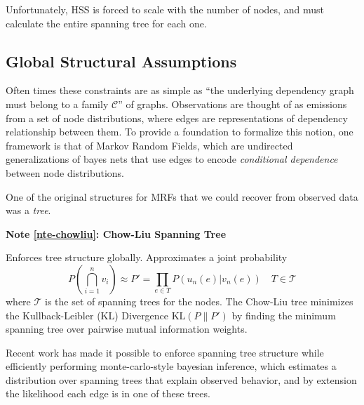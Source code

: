 \documentclass[%
	12pt,
		oneside,
		letterpaper
]{book}
\newcounter{quartocalloutnteno}
\newcommand{\quartocalloutnte}[1]{\refstepcounter{quartocalloutnteno}\label{#1}}
\begin{document}
Unfortunately, HSS is forced to scale with the number of nodes, and must
calculate the entire spanning tree for each one.

\subsection{Global Structural
Assumptions}\label{global-structural-assumptions}

Often times these constraints are as simple as ``the underlying
dependency graph must belong to a family \(\mathcal{C}\)'' of graphs.
Observations are thought of as emissions from a set of node
distributions, where edges are representations of dependency
relationship between them. To provide a foundation to formalize this
notion, one framework is that of Markov Random Fields, which are
undirected generalizations of bayes nets
\autocite{Markovrandomfields_Kindermann1980} that use edges to encode
\emph{conditional dependence} between node distributions.

One of the original structures for MRFs that we could recover from
observed data was a \emph{tree}.

\begin{tcolorbox}[enhanced jigsaw, opacityback=0, colframe=quarto-callout-note-color-frame, arc=.35mm, leftrule=.75mm, breakable, bottomrule=.15mm, left=2mm, colback=white, toprule=.15mm, rightrule=.15mm]

\quartocalloutnte{nte-chowliu} 

\vspace{-3mm}\textbf{Note \ref*{nte-chowliu}: Chow-Liu Spanning Tree}\vspace{3mm}

Enforces tree structure globally. Approximates a joint probability \[
P\left(\bigcap_{i=1}^n v_i\right) \approx P' = \prod_{e\in T} P(u_n(e)|v_n(e)) \quad T\in \mathcal{T}
\] where \(\mathcal{T}\) is the set of spanning trees for the nodes. The
Chow-Liu tree minimizes the Kullback-Leibler (KL) Divergence
\(\text{KL}(P \| P')\) by finding the minimum spanning tree over
pairwise mutual information
weights.\autocite{Approximatingdiscreteprobability_Chow1968}

\end{tcolorbox}

Recent work has made it possible to enforce spanning tree structure
while efficiently performing monte-carlo-style bayesian inference, which
estimates a distribution over spanning trees that explain observed
behavior, and by extension the likelihood each edge is in one of these
trees. \autocite{BayesianSpanningTree_Duan2021}
\end{document}
